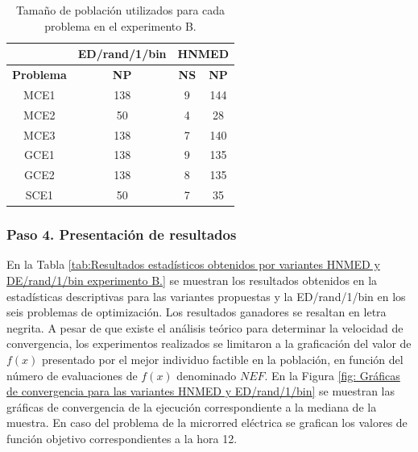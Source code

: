 \begin{table}[H]
	\centering
	\caption{Tamaño de población utilizados para cada problema en el experimento B.}
	\label{tab:Tamaño de población utilizados para cada problema en el experimento B.}
	\begin{tabular}{cccc}
		& \textbf{ED/rand/1/bin }& \multicolumn{2}{l}{\textbf{HNMED}} \\
		\hline
		\textbf{Problema} & \textbf{NP}            & \textbf{NS}          & \textbf{NP}          \\
		\hline
		MCE1     & 138           & 9           & 144         \\
		MCE2     & 50            & 4           & 28          \\
		MCE3     & 138           & 7           & 140         \\
		GCE1     & 138           & 9           & 135         \\
		GCE2     & 138           & 8           & 135         \\
		SCE1     & 50            & 7           & 35         
	\end{tabular}
\end{table}

\subsubsection{Paso 4. Presentación de resultados}
En la Tabla \ref{tab:Resultados estadísticos obtenidos por variantes HNMED y DE/rand/1/bin  experimento B.} se muestran los resultados obtenidos en la estadísticas descriptivas para las variantes propuestas y la ED/rand/1/bin en los seis problemas de optimización. Los resultados ganadores se resaltan en letra negrita. A pesar de que existe el análisis teórico para determinar la velocidad de convergencia, los experimentos realizados se limitaron a la graficación del valor de $f(x)$ presentado por el mejor individuo factible en la población, en función del número de evaluaciones de $f(x)$ denominado $NEF$. En la Figura \ref{fig: Gráficas de convergencia para las variantes HNMED y ED/rand/1/bin} se muestran las gráficas de convergencia de la ejecución correspondiente a la mediana de la muestra. En caso del problema de la microrred eléctrica se grafican los valores de función objetivo correspondientes a la hora 12.   

